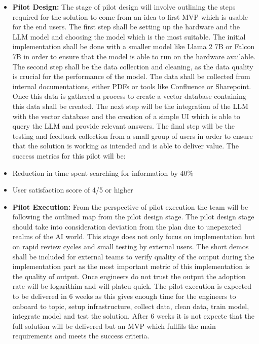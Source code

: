 \documentclass[]{imc-inf}
\begin{document}
\begin{itemize}
	\item
	\textbf{Pilot Design:} The stage of pilot design will involve
	outlining the steps required for the solution to come from an idea to
	first MVP which is usable for the end users. The first step shall be
	setting up the hardware and the LLM model and choosing the model which
	is the most suitable. The initial implementation shall be done with a
	smaller model like Llama 2 7B or Falcon 7B in order to ensure that the
	model is able to run on the hardware available. The second step shall
	be the data collection and cleaning, as the data quality is crucial
	for the performance of the model. The data shall be collected from
	internal documentations, either PDFs or tools like Confluence or
	Sharepoint. Once this data is gathered a process to create a vector
	database containing this data shall be created. The next step will be
	the integration of the LLM with the vector database and the creation
	of a simple UI which is able to query the LLM and provide relevant
	answers. The final step will be the testing and feedback collection
	from a small group of users in order to ensure that the solution is
	working as intended and is able to deliver value. The success metrics
	for this pilot will be:
	\item
	Reduction in time spent searching for information by 40\%
	\item
	User satisfaction score of 4/5 or higher
	\item
	\textbf{Pilot Execution:} From the perspective of pilot execution the
	team will be following the outlined map from the pilot design stage.
	The pilot design stage should take into consideration deviation from
	the plan due to unepexcted realms of the AI world. This stage does not
	only focus on implementation but on rapid review cycles and small
	testing by external users. The short demos shall be included for
	external teams to verify quality of the output during the
	implementation part as the most important metric of this
	implementation is the quality of output. Once engineers do not trust
	the output the adoption rate will be logarithim and will plateu quick.
	The pilot execution is expected to be delivered in 6 weeks as this
	gives enough time for the engineers to onboard to topic, setup
	infrastructure, collect data, clean data, train model, integrate model
	and test the solution. After 6 weeks it is not expecte that the full
	solution will be delivered but an MVP which fullfils the main
	requirements and meets the success criteria.

\end{itemize}
\end{document}

